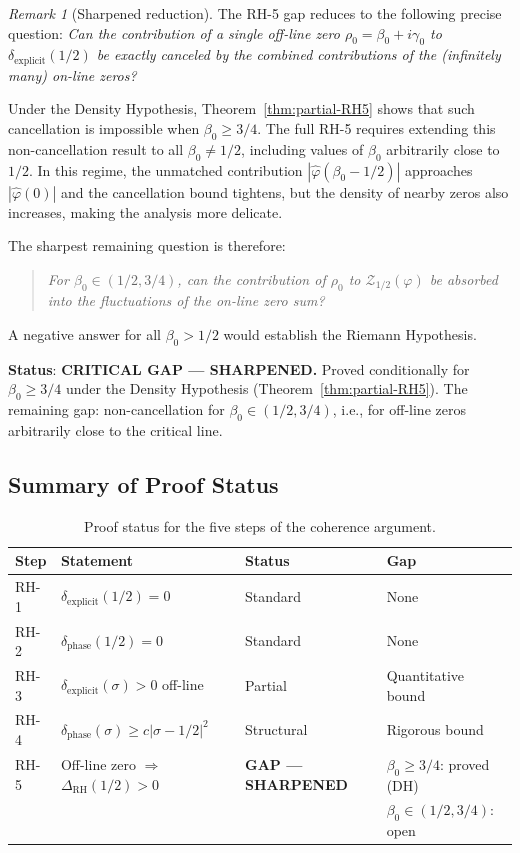 \documentclass[11pt]{article}
\theoremstyle{remark}
\newtheorem{remark}[theorem]{Remark}
\begin{document}
\begin{remark}[Sharpened reduction]
\label{rem:sharpened-RH5}
The RH-5 gap reduces to the following precise question:
\emph{Can the contribution of a single off-line zero
$\rho_0 = \beta_0 + i\gamma_0$ to $\delta_{\mathrm{explicit}}(1/2)$
be exactly canceled by the combined contributions of the (infinitely many)
on-line zeros?}

Under the Density Hypothesis, Theorem~\ref{thm:partial-RH5} shows that
such cancellation is impossible when $\beta_0 \geq 3/4$.  The full RH-5
requires extending this non-cancellation result to all $\beta_0 \neq 1/2$,
including values of $\beta_0$ arbitrarily close to $1/2$.  In this regime,
the unmatched contribution $|\hat{\varphi}(\beta_0 - 1/2)|$ approaches
$|\hat{\varphi}(0)|$ and the cancellation bound tightens, but the density of
nearby zeros also increases, making the analysis more delicate.

The sharpest remaining question is therefore:
\begin{quote}
\emph{For $\beta_0 \in (1/2, 3/4)$, can the contribution of $\rho_0$
to $\mathcal{Z}_{1/2}(\varphi)$ be absorbed into the fluctuations of the
on-line zero sum?}
\end{quote}
A negative answer for all $\beta_0 > 1/2$ would establish the
Riemann Hypothesis.
\end{remark}

\noindent\textbf{Status}: \textbf{CRITICAL GAP --- SHARPENED.}
Proved conditionally for $\beta_0 \geq 3/4$ under the Density Hypothesis
(Theorem~\ref{thm:partial-RH5}).
The remaining gap: non-cancellation for $\beta_0 \in (1/2, 3/4)$,
i.e., for off-line zeros arbitrarily close to the critical line.

\subsection{Summary of Proof Status}

\begin{table}[ht]
\centering
\begin{tabular}{@{}llll@{}}
\toprule
Step & Statement & Status & Gap \\
\midrule
RH-1 & $\delta_{\mathrm{explicit}}(1/2)=0$ & Standard & None \\
RH-2 & $\delta_{\mathrm{phase}}(1/2)=0$ & Standard & None \\
RH-3 & $\delta_{\mathrm{explicit}}(\sigma)>0$ off-line & Partial &
  Quantitative bound \\
RH-4 & $\delta_{\mathrm{phase}}(\sigma)\geq c|\sigma-1/2|^2$ & Structural &
  Rigorous bound \\
RH-5 & Off-line zero $\Rightarrow$ $\Delta_{\mathrm{RH}}(1/2)>0$ &
  \textbf{GAP --- SHARPENED} & $\beta_0 \geq 3/4$: proved (DH) \\
  & & & $\beta_0 \in (1/2,3/4)$: open \\
\bottomrule
\end{tabular}
\caption{Proof status for the five steps of the coherence argument.}
\label{tab:status}
\end{table}
\end{document}
